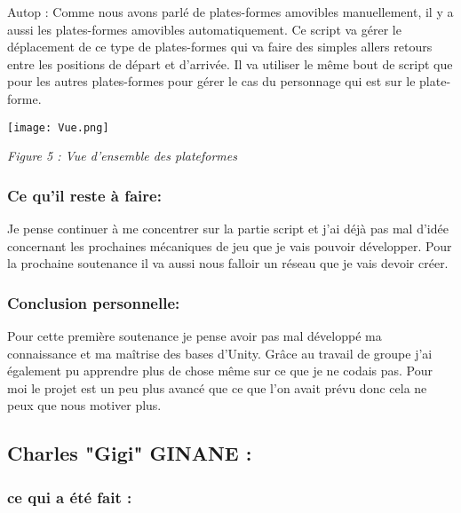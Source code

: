 \documentclass[a4paper]{article}
\begin{document}
Autop : Comme nous avons parlé de plates-formes amovibles manuellement, il y a aussi les plates-formes amovibles automatiquement. Ce script va gérer le déplacement de ce type de plates-formes qui va faire des simples allers retours entre les positions de départ et d'arrivée. Il va utiliser le même bout de script que pour les autres plates-formes pour gérer le cas du personnage qui est sur le plate-forme.



\quad

\begin{center}

\texttt{[image: Vue.png]}

\quad

\textit {Figure 5 : Vue d'ensemble des plateformes}

\end{center}


\quad


		\subsubsection{Ce qu'il reste à faire:}

\quad

Je pense continuer à me concentrer sur la partie script et j’ai déjà pas mal d’idée concernant les prochaines mécaniques de jeu que je vais pouvoir développer. Pour la prochaine soutenance il va aussi nous falloir un réseau que je vais devoir créer.
\quad
		\subsubsection{Conclusion personnelle:}

\quad

Pour cette première soutenance je pense avoir pas mal développé ma connaissance et ma maîtrise des bases d’Unity. Grâce au travail de groupe j’ai également pu apprendre plus de chose même sur ce que je ne codais pas. Pour moi le projet est un peu plus avancé que ce que l’on avait prévu donc cela ne peux que nous motiver plus.

\quad
\newpage

	\subsection{Charles "Gigi" GINANE :}

\quad

		\subsubsection{ce qui a été fait :}
\end{document}
